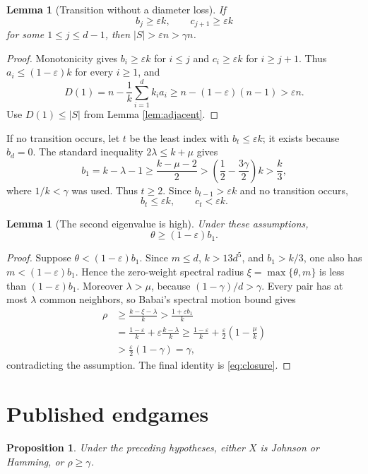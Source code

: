 \documentclass[11pt]{amsart}
\newtheorem{proposition}[theorem]{Proposition}
\newtheorem{lemma}[theorem]{Lemma}
\theoremstyle{definition}
\newcommand{\eps}{\varepsilon}
\newcommand{\gam}{\gamma}
\begin{document}
\begin{lemma}[Transition without a diameter loss]\label{lem:transition}
If
\[
 b_j\ge\eps k,
 \qquad
 c_{j+1}\ge\eps k
\]
for some $1\le j\le d-1$, then $|S|>\eps n>\gam n$.
\end{lemma}

\begin{proof}
Monotonicity gives $b_i\ge\eps k$ for $i\le j$ and $c_i\ge\eps k$ for $i\ge j+1$.  Thus $a_i\le(1-\eps)k$ for every $i\ge1$, and
\[
 D(1)=n-\frac1k\sum_{i=1}^{d}k_i a_i
 \ge n-(1-\eps)(n-1)>\eps n.
\]
Use $D(1)\le|S|$ from Lemma \ref{lem:adjacent}.
\end{proof}

If no transition occurs, let $t$ be the least index with $b_t\le\eps k$; it exists because $b_d=0$.  The standard inequality $2\lambda\le k+\mu$ gives
\[
 b_1=k-\lambda-1\ge\frac{k-\mu-2}{2}
 >\left(\frac12-\frac{3\gam}{2}\right)k>\frac{k}{3},
\]
where $1/k<\gam$ was used.  Thus $t\ge2$.  Since $b_{t-1}>\eps k$ and no transition occurs,
\begin{equation}\label{eq:smallbtct}
 b_t\le\eps k,
 \qquad
 c_t<\eps k.
\end{equation}

\begin{lemma}[The second eigenvalue is high]\label{lem:hightheta}
Under these assumptions,
\[
 \theta\ge(1-\eps)b_1.
\]
\end{lemma}

\begin{proof}
Suppose $\theta<(1-\eps)b_1$.  Since $m\le d$, $k>13d^5$, and $b_1>k/3$, one also has $m<(1-\eps)b_1$.  Hence the zero-weight spectral radius $\xi=\max\{\theta,m\}$ is less than $(1-\eps)b_1$.  Moreover $\lambda>\mu$, because $(1-\gam)/d>\gam$.  Every pair has at most $\lambda$ common neighbors, so Babai's spectral motion bound \cite[Proposition 2.13]{PS} gives
\begin{align*}
 \rho
 &\ge\frac{k-\xi-\lambda}{k}
 >\frac{1+\eps b_1}{k}\\
 &=\frac{1-\eps}{k}+\eps\frac{k-\lambda}{k}
 \ge\frac{1-\eps}{k}+\frac\eps2\left(1-\frac\mu k\right)\\
 &>\frac\eps2(1-\gam)=\gam,
\end{align*}
contradicting the assumption.  The final identity is \eqref{eq:closure}.
\end{proof}

\section{Published endgames}
\begin{proposition}\label{prop:endgames}
Under the preceding hypotheses, either $X$ is Johnson or Hamming, or $\rho\ge\gam$.
\end{proposition}
\end{document}
